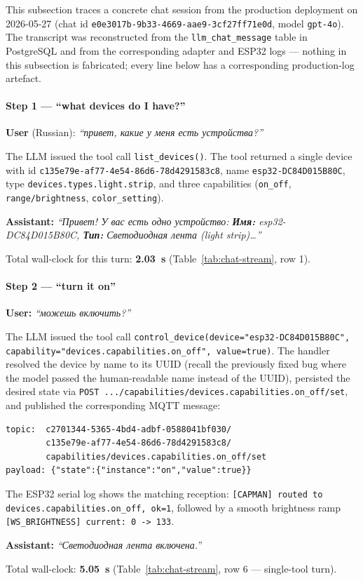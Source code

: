 \documentclass[a4paper,12pt]{article}
\begin{document}
This subsection traces a concrete chat session from the production deployment on 2026-05-27 (chat id \verb|e0e3017b-9b33-4669-aae9-3cf27ff71e0d|, model \verb|gpt-4o|). The transcript was reconstructed from the \verb|llm_chat_message| table in PostgreSQL and from the corresponding adapter and ESP32 logs --- nothing in this subsection is fabricated; every line below has a corresponding production-log artefact.

\paragraph{Step 1 --- ``what devices do I have?''}
\textbf{User} (Russian):  \foreignlanguage{russian}{\emph{``привет, какие у меня есть устройства?''}}\par
The LLM issued the tool call \verb|list_devices()|. The tool returned a single device with id \verb|c135e79e-af77-4e54-86d6-78d4291583c8|, name \verb|esp32-DC84D015B80C|, type \verb|devices.types.light.strip|, and three capabilities (\verb|on_off|, \verb|range/brightness|, \verb|color_setting|).\par
\textbf{Assistant:} \foreignlanguage{russian}{\emph{``Привет! У вас есть одно устройство: \textbf{Имя:} esp32-DC84D015B80C, \textbf{Тип:} Светодиодная лента (light strip)\ldots''}}\par
Total wall-clock for this turn: \textbf{2.03~s} (Table~\ref{tab:chat-stream}, row 1).

\paragraph{Step 2 --- ``turn it on''}
\textbf{User:} \foreignlanguage{russian}{\emph{``можешь включить?''}}\par
The LLM issued the tool call \verb|control_device(device="esp32-DC84D015B80C",| \verb|capability="devices.capabilities.on_off", value=true)|. The handler resolved the device by name to its UUID (recall the previously fixed bug where the model passed the human-readable name instead of the UUID), persisted the desired state via \verb|POST .../capabilities/devices.capabilities.on_off/set|, and published the corresponding MQTT message:
\begin{lstlisting}[basicstyle=\ttfamily\footnotesize,frame=single,breaklines=true]
topic:  c2701344-5365-4bd4-adbf-0588041bf030/
        c135e79e-af77-4e54-86d6-78d4291583c8/
        capabilities/devices.capabilities.on_off/set
payload: {"state":{"instance":"on","value":true}}
\end{lstlisting}
The ESP32 serial log shows the matching reception: \verb|[CAPMAN] routed to devices.capabilities.on_off, ok=1|, followed by a smooth brightness ramp \verb|[WS_BRIGHTNESS] current: 0 -> 133|.\par
\textbf{Assistant:} \foreignlanguage{russian}{\emph{``Светодиодная лента включена.''}}\par
Total wall-clock: \textbf{5.05~s} (Table~\ref{tab:chat-stream}, row 6 --- single-tool turn).
\end{document}

